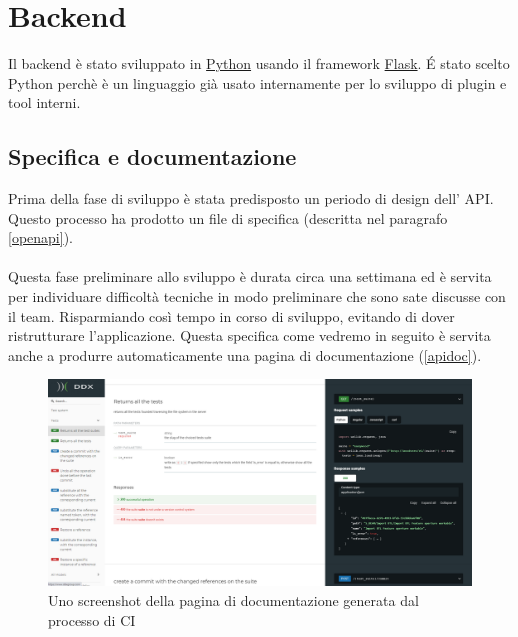 \chapter{Backend}
        Il backend è stato sviluppato in \href{https://www.python.org}{Python} usando il framework \href{https://flask.palletsprojects.com/en/1.1.x/}{Flask}.
        \'E stato scelto Python perchè è un linguaggio già usato internamente per lo sviluppo di plugin e tool interni.

        \section{Specifica e documentazione}
            Prima della fase di sviluppo è stata predisposto un periodo di design dell' API.
            Questo processo ha prodotto un file di specifica (descritta nel paragrafo 
            \ref{openapi}).\\\\
            Questa fase preliminare allo sviluppo è durata circa una settimana ed è servita per 
            individuare difficoltà tecniche in modo preliminare che sono sate discusse con il team.
            Risparmiando così tempo in corso di sviluppo, evitando di dover ristrutturare l'applicazione.
            Questa specifica come vedremo in seguito è servita anche a produrre automaticamente una pagina di documentazione (\ref{apidoc}).
            
            \begin{figure}
                \includegraphics[width=\textwidth]{images/documentation.png}
                \caption{Uno screenshot della pagina di documentazione generata dal processo di CI}
            \end{figure}
            
